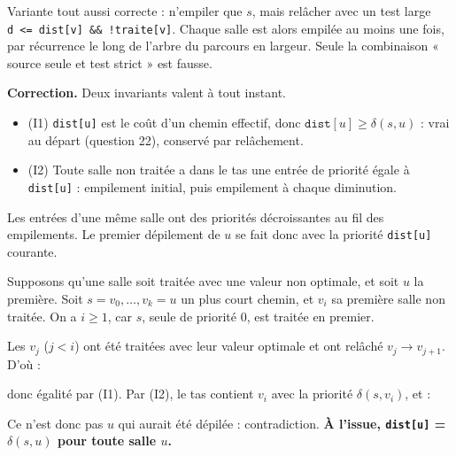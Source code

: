 \documentclass[11pt,a4paper]{article}
\providecommand{\tightlist}{\setlength{\itemsep}{0pt}\setlength{\parskip}{0pt}}
\newcommand{\equationajustee}[1]{%
  \sbox{\boiteequation}{$\displaystyle #1$}%
  \ifdim\wd\boiteequation>\linewidth
    \[\resizebox{\linewidth}{!}{\usebox{\boiteequation}}\]%
  \else
    \[#1\]%
  \fi}
\begin{document}
Variante tout aussi correcte : n'empiler que \(s\), mais relâcher avec un test large \texttt{d\ \textless{}=\allowbreak{}\ dist{[}v{]}\allowbreak{}\ \&\&\ !traite{[}v{]}\allowbreak{}}. Chaque salle est alors empilée au moins une fois, par récurrence le long de l'arbre du parcours en largeur. Seule la combinaison « source seule et test strict » est fausse.

\textbf{Correction.} Deux invariants valent à tout instant.

\begin{itemize}
\tightlist
\item
  (I1) \texttt{dist{[}u{]}} est le coût d'un chemin effectif, donc \(\texttt{dist}[u] \ge \delta(s,u)\) : vrai au départ (question 22), conservé par relâchement.
\item
  (I2) Toute salle non traitée a dans le tas une entrée de priorité égale à \texttt{dist{[}u{]}} : empilement initial, puis empilement à chaque diminution.
\end{itemize}

Les entrées d'une même salle ont des priorités décroissantes au fil des empilements. Le premier dépilement de \(u\) se fait donc avec la priorité \texttt{dist{[}u{]}} courante.

Supposons qu'une salle soit traitée avec une valeur non optimale, et soit \(u\) la première. Soit \(s = v_0, \dots, v_k = u\) un plus court chemin, et \(v_i\) sa première salle non traitée. On a \(i \ge 1\), car \(s\), seule de priorité 0, est traitée en premier.

Les \(v_j\) (\(j < i\)) ont été traitées avec leur valeur optimale et ont relâché \(v_j \to v_{j+1}\). D'où :

\equationajustee{\begin{aligned}
\texttt{dist}[v_i] &\le \delta(s,v_{i-1}) + c(v_{i-1},v_i) \\
&= \delta(s,v_i),
\end{aligned}}

donc égalité par (I1). Par (I2), le tas contient \(v_i\) avec la priorité \(\delta(s,v_i)\), et :

\equationajustee{\begin{aligned}
\delta(s,v_i) &\le \delta(s,u) \\
&< \texttt{dist}[u].
\end{aligned}}

Ce n'est donc pas \(u\) qui aurait été dépilée : contradiction. \textbf{À l'issue, \texttt{dist{[}u{]}} = \(\delta(s,u)\) pour toute salle \(u\).}
\end{document}

